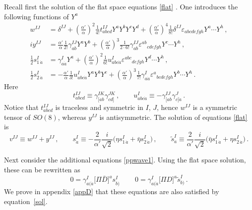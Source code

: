 \documentclass[12pt]{article}
\def\a{\alpha}
\def\g{\gamma}
\def\d{\delta}
\def\e{\varepsilon}
\numberwithin{equation}{section} \setlength{\textwidth}{17cm}
\begin{document}
Recall first the solution of the flat space equations \eqref{flat} \cite{gsb}. One introduces the following functions
of $Y^a$
\begin{align}
w^{IJ} & = \d^{IJ} +\left(\frac{\a'}{\a}\right)^2\frac{1}{4!}t^{IJ}_{abcd}Y^aY^bY^cY^d
+\left(\frac{\a'}{\a}\right)^4\frac{1}{8!}\d^{IJ}\e_{abcdefgh}Y^a\cdots Y^h\,,\\
iy^{IJ} & = \frac{\a'}{\a}\frac{1}{2!}\g^{IJ}_{ab}Y^aY^b+\left(\frac{\a'}{\a}\right)^3\frac{1}{2\cdot 6!}
\g^{IJ}_{ab}{\e^{ab}}_{cdefgh}Y^c\cdots Y^h\,,\\
\frac{1}{2}s^I_{1\,\dot{a}} & = 
\g^I_{a\dot{a}}Y^a+\left(\frac{\a'}{\a}\right)^2\frac{1}{6!}
u^I_{abc\dot{a}}{\e^{abc}}_{defgh}Y^d\cdots Y^h\,,\\
\frac{1}{2}s^I_{2\,\dot{a}} & = 
-\frac{\a'}{\a}\frac{1}{3!}u^I_{abc\dot{a}}Y^aY^bY^c+
\left(\frac{\a'}{\a}\right)^3\frac{1}{7!}\g^I_{a\dot{a}}{\e^{a}}_{bcdefgh}Y^b\cdots Y^h\,.
\end{align}
Here
\begin{equation}
t^{IJ}_{abcd}\equiv\g^{IK}_{[ab}\g^{JK}_{cd]}\,,\qquad u^I_{abc\dot{a}}\equiv -\g^{IJ}_{[ab}\g^J_{c]\dot{a}}\,.
\end{equation}
Notice that $t^{IJ}_{abcd}$ is traceless and symmetric in $I$, $J$, hence $w^{IJ}$
is a symmetric tensor of $SO(8)$, whereas $y^{IJ}$ is antisymmetric. 
The solution of equations \eqref{flat} is~\cite{gsb}
\begin{equation}\label{sol}
v^{IJ}\equiv w^{IJ}+y^{IJ}\,,\qquad
s^I_{\dot{a}}\equiv-\frac{2}{\a'}\frac{i}{\sqrt{2}}
\bigl(\eta s^I_{1\,\dot{a}}+\bar{\eta}s^I_{2\,\dot{a}}\bigr)\,,\qquad
\tilde{s}^I_{\dot{a}}\equiv \frac{2}{\a'}\frac{i}{\sqrt{2}}
\bigl(\bar{\eta} s^I_{1\,\dot{a}}+\eta s^I_{2\,\dot{a}}\bigr)\,.
\end{equation}

\noindent Next consider the additional equations \eqref{ppwave1}. Using the flat space
solution, these can be rewritten as
\begin{equation}
0=\g^I_{a(\dot{a}}\bigl[\Pi\bar{D}\bigr]^as^I_{\dot{b})}\,\qquad
0=\g^I_{a(\dot{a}}\bigl[\Pi D\bigr]^a\tilde{s}^I_{\dot{b})}\,.
\end{equation}
We prove in appendix \ref{appD} that these equations are also 
satisfied by equation~\eqref{sol}.
\end{document}
